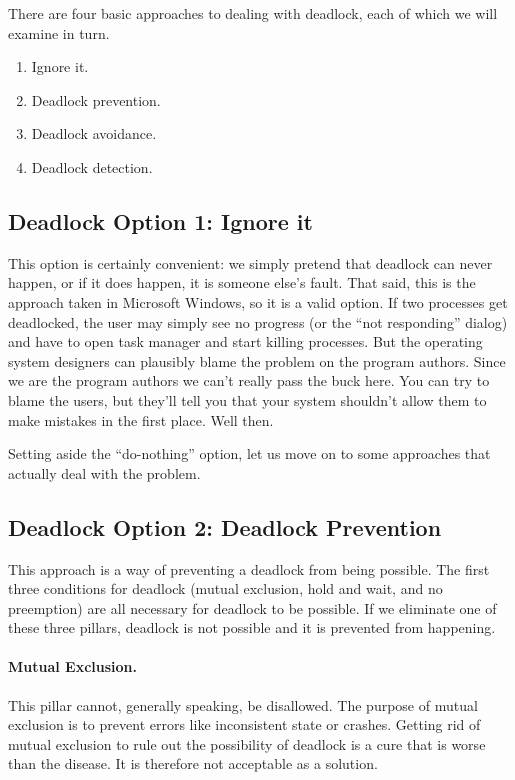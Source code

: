 There are four basic approaches to dealing with deadlock, each of which we will examine in turn.
\begin{enumerate}
	\item Ignore it.
	\item Deadlock prevention.
	\item Deadlock avoidance.
	\item Deadlock detection.
\end{enumerate}

\subsection*{Deadlock Option 1: Ignore it}
This option is certainly convenient: we simply pretend that deadlock can never happen, or if it does happen, it is someone else's fault. That said, this is the approach taken in Microsoft Windows, so it is a valid option. If two processes get deadlocked, the user may simply see no progress (or the ``not responding'' dialog) and have to open task manager and start killing processes. But the operating system designers can plausibly blame the problem on the program authors. Since we are the program authors we can't really pass the buck here. You can try to blame the users, but they'll tell you that your system shouldn't allow them to make mistakes in the first place. Well then.

Setting aside the ``do-nothing'' option, let us move on to some approaches that actually deal with the problem.

\subsection*{Deadlock Option 2: Deadlock Prevention}

This approach is a way of preventing a deadlock from being possible. The first three conditions for deadlock (mutual exclusion, hold and wait, and no preemption) are all necessary for deadlock to be possible. If we eliminate one of these three pillars, deadlock is not possible and it is prevented from happening.

\paragraph{Mutual Exclusion.} This pillar cannot, generally speaking, be disallowed. The purpose of  mutual exclusion is to prevent errors like inconsistent state or crashes. Getting rid of mutual exclusion to rule out the possibility of deadlock is a cure that is worse than the disease. It is therefore not acceptable as a solution.

